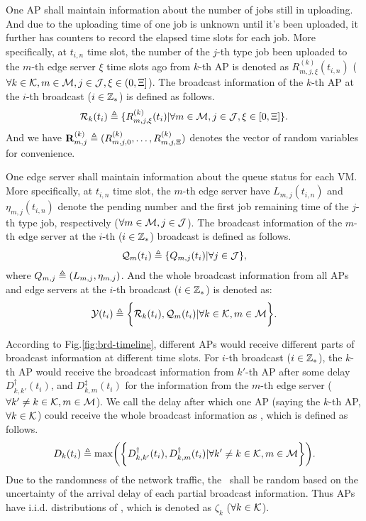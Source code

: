 One AP shall maintain information about the number of jobs still in uploading. 
And due to the uploading time of one job is unknown until it's been uploaded, it further has counters to record the elapsed time slots for each job.
More specifically, at $t_{i,n}$ time slot, the number of the $j$-th type job been uploaded to the $m$-th edge server $\xi$ time slots ago from $k$-th AP is denoted as $R^{(k)}_{m,j,\xi}(t_{i,n})$ ($\forall k\in\mathcal{K}, m\in\mathcal{M}, j\in\mathcal{J}, \xi\in(0,\Xi]$).
The broadcast information of the $k$-th AP at the $i$-th broadcast ($i\in\mathbb{Z}_{*}$) is defined as follows.
\begin{align}
    \mathcal{R}_{k}(t_{i}) \triangleq \{R^{(k)}_{m,j,\xi}(t_{i}) | \forall m\in\mathcal{M}, j\in\mathcal{J}, \xi \in [0,\Xi]\}.
\end{align}
And we have $\mathbf{R}^{(k)}_{m,j} \triangleq ( R^{(k)}_{m,j,0},\dots,R^{(k)}_{m,j,\Xi} )$ denotes the vector of random variables for convenience.

One edge server shall maintain information about the queue status for each VM.
More specifically, at $t_{i,n}$ time slot, the $m$-th edge server have $L_{m,j}(t_{i,n})$ and $\eta_{m,j}(t_{i,n})$ denote the pending number and the first job remaining time of the $j$-th type job, respectively ($\forall m\in\mathcal{M}, j\in\mathcal{J}$).
The broadcast information of the $m$-th edge server at the $i$-th ($i\in\mathbb{Z}_{*}$) broadcast is defined as follows.
\begin{align}
    \mathcal{Q}_{m}(t_{i}) \triangleq \{Q_{m,j}(t_{i}) | \forall j\in\mathcal{J}\},
\end{align}
where $Q_{m,j} \triangleq (L_{m,j}, \eta_{m,j})$.
And the whole broadcast information from all APs and edge servers at the $i$-th broadcast ($i\in\mathbb{Z}_{*}$) is denoted as:
\begin{align}
    \mathcal{Y}(t_{i}) \triangleq
        \bigg\{
            \mathcal{R}_{k}(t_{i}), \mathcal{Q}_{m}(t_{i}) | \forall k\in\mathcal{K}, m\in\mathcal{M}
        \bigg\}.
\end{align}

According to Fig.\ref{fig:brd-timeline}, different APs would receive different parts of broadcast information at different time slots.
For $i$-th broadcast ($i\in\mathbb{Z}_{*}$), the $k$-th AP would receive the broadcast information from $k'$-th AP after some delay $D^{\dagger}_{k,k'}(t_{i})$, and $D^{\ddagger}_{k,m}(t_{i})$ for the information from the $m$-th edge server ($\forall k' \neq k \in\mathcal{K}, m\in\mathcal{M}$).
We call the delay after which one AP (saying the $k$-th AP, $\forall k\in\mathcal{K}$) could receive the whole broadcast information as \brdelay, which is defined as follows.
\begin{align}
    D_{k}(t_{i}) \define \max\Paren{\Brace{
        D^{\dagger}_{k,k'}(t_{i}),
        D^{\dagger}_{k,m}(t_{i}) | \forall k' \neq k \in \apSet, m\in\esSet
    }}.
\end{align}
Due to the randomness of the network traffic, the \brdelay~shall be random based on the uncertainty of the arrival delay of each partial broadcast information.
Thus APs have i.i.d. distributions of \brdelay, which is denoted as $\zeta_{k}$ ($\forall k \in \mathcal{K}$).

